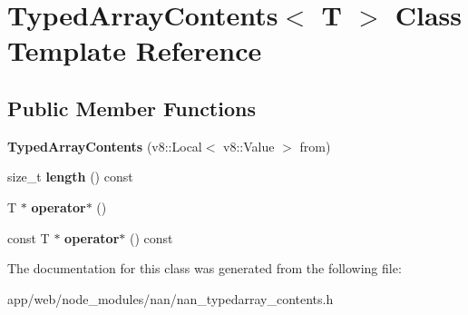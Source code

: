 \hypertarget{class_typed_array_contents}{}\section{Typed\+Array\+Contents$<$ T $>$ Class Template Reference}
\label{class_typed_array_contents}
\subsection*{Public Member Functions}
\begin{DoxyCompactItemize}
\item 
\mbox{\label{class_typed_array_contents_af6f95205f9c6526e7f9ec21c8ef9500f}} 
{\bfseries Typed\+Array\+Contents} (v8\+::\+Local$<$ v8\+::\+Value $>$ from)
\item 
\mbox{\label{class_typed_array_contents_a22d12d2c9c22fbc40f9f8314a7948025}} 
size\+\_\+t {\bfseries length} () const
\item 
\mbox{\label{class_typed_array_contents_a15e72c02ad7bd9d5ca875992e8677f03}} 
T $\ast$ {\bfseries operator$\ast$} ()
\item 
\mbox{\label{class_typed_array_contents_a97391b864e7968463a948c0da99cb03c}} 
const T $\ast$ {\bfseries operator$\ast$} () const
\end{DoxyCompactItemize}


The documentation for this class was generated from the following file\+:\begin{DoxyCompactItemize}
\item 
app/web/node\+\_\+modules/nan/nan\+\_\+typedarray\+\_\+contents.\+h\end{DoxyCompactItemize}
